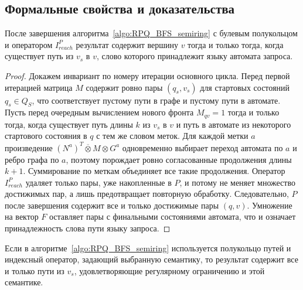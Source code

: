\subsection{Формальные свойства и доказательства}
\label{subsec:RPQ_BFS_properties}

\begin{theorem}
    После завершения алгоритма~\ref{algo:RPQ_BFS_semiring} с булевым полукольцом и оператором $I^P_{\mathit{reach}}$ результат содержит вершину $v$ тогда и только тогда, когда существует путь из $v_s$ в $v$, слово которого принадлежит языку автомата запроса.
\end{theorem}

\begin{proof}
    Докажем инвариант по номеру итерации основного цикла.
    Перед первой итерацией матрица $M$ содержит ровно пары $(q_s, v_s)$ для стартовых состояний $q_s \in Q_S$, что соответствует пустому пути в графе и пустому пути в автомате.
    Пусть перед очередным вычислением нового фронта $M_{qv} = 1$ тогда и только тогда, когда существует путь длины $k$ из $v_s$ в $v$ и путь в автомате из некоторого стартового состояния в $q$ с тем же словом меток.
    Для каждой метки $a$ произведение $(N^a)^T \overline{\otimes} M \otimes G^a$ одновременно выбирает переход автомата по $a$ и ребро графа по $a$, поэтому порождает ровно согласованные продолжения длины $k+1$.
    Суммирование по меткам объединяет все такие продолжения.
    Оператор $I^P_{\mathit{reach}}$ удаляет только пары, уже накопленные в $P$, и потому не меняет множество достижимых пар, а лишь предотвращает повторную обработку.
    Следовательно, $P$ после завершения содержит все и только достижимые пары $(q,v)$.
    Умножение на вектор $F$ оставляет пары с финальными состояниями автомата, что и означает принадлежность слова пути языку запроса.
\end{proof}

\begin{theorem}
    Если в алгоритме~\ref{algo:RPQ_BFS_semiring} используется полукольцо путей и индексный оператор, задающий выбранную семантику, то результат содержит все и только пути из $v_s$, удовлетворяющие регулярному ограничению и этой семантике.
\end{theorem}

